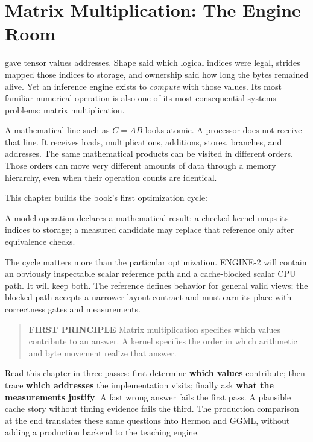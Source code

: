 \chapter{Matrix Multiplication: The Engine Room}\label{chapter-6-matrix-multiplication-the-engine-room}\label{app:matmul}
 gave tensor values addresses. Shape said which logical indices
were legal, strides mapped those indices to storage, and ownership said
how long the bytes remained alive. Yet an inference engine exists to
\emph{compute} with those values. Its most familiar numerical operation
is also one of its most consequential systems problems: matrix
multiplication.

A mathematical line such as \(C=AB\) looks atomic. A processor does not
receive that line. It receives loads, multiplications, additions,
stores, branches, and addresses. The same mathematical products can be
visited in different orders. Those orders can move very different
amounts of data through a memory hierarchy, even when their operation
counts are identical.

This chapter builds the book's first optimization cycle:

A model operation declares a mathematical result; a checked kernel maps its indices to storage; a measured candidate may replace that reference only after equivalence checks.

The cycle matters more than the particular optimization. ENGINE-2 will
contain an obviously inspectable scalar reference path and a
cache-blocked scalar CPU path. It will keep both. The reference defines
behavior for general valid views; the blocked path accepts a narrower
layout contract and must earn its place with correctness gates and
measurements.

\begin{quote}
\textbf{FIRST PRINCIPLE} Matrix multiplication specifies which values
contribute to an answer. A kernel specifies the order in which
arithmetic and byte movement realize that answer.
\end{quote}


Read this chapter in three passes: first determine \textbf{which values}
contribute; then trace \textbf{which addresses} the implementation
visits; finally ask \textbf{what the measurements justify}. A fast wrong
answer fails the first pass. A plausible cache story without timing
evidence fails the third. The production comparison at the end
translates these same questions into Hermon and GGML, without adding a
production backend to the teaching engine.

